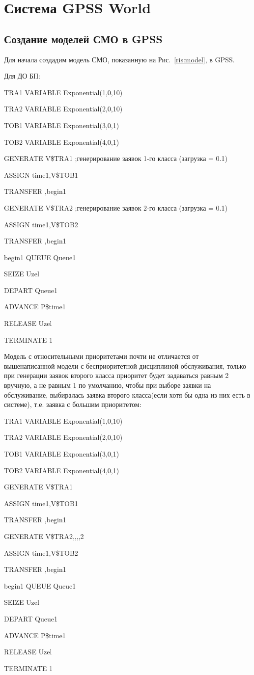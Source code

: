 \documentclass[a4paper,14pt]{report} %
\begin{document}
\section{Система GPSS World}
\subsection{Создание моделей СМО в GPSS}
Для начала создадим модель СМО, показанную на Рис.~\ref{ris:model}, в GPSS.

Для ДО БП:\par\noindent
TRA1	VARIABLE	Exponential(1,0,10) \par\noindent
TRA2	VARIABLE	Exponential(2,0,10) \par\noindent
TOB1	VARIABLE	Exponential(3,0,1) \par\noindent
TOB2	VARIABLE	Exponential(4,0,1)  \par              
GENERATE	V\$TRA1 ;генерирование заявок 1-го класса (загрузка = 0.1)\par 
ASSIGN 	time1,V\$TOB1 \par
TRANSFER ,begin1 \par
GENERATE	V\$TRA2 ;генерирование заявок 2-го класса (загрузка = 0.1)\par 
ASSIGN 	time1,V\$TOB2 \par
TRANSFER ,begin1 \par\noindent
begin1	QUEUE	Queue1 \par
SEIZE 	Uzel \par
DEPART	Queue1 \par
ADVANCE 	P\$time1 \par
RELEASE 	Uzel \par
TERMINATE 1 \par
\vspace{0.5cm} 
Модель с относительными приоритетами почти не отличается от вышенаписанной модели с бесприоритетной дисциплиной обслуживания, только при генерации заявок второго класса приоритет будет задаваться равным 2 вручную, а не равным 1 по умолчанию, чтобы при выборе заявки на обслуживание, выбиралась заявка второго класса(если хотя бы одна из них есть в системе), т.е. заявка с большим приоритетом:\par\noindent
TRA1	VARIABLE	Exponential(1,0,10) \par\noindent
TRA2	VARIABLE	Exponential(2,0,10) \par\noindent
TOB1	VARIABLE	Exponential(3,0,1) \par\noindent
TOB2	VARIABLE	Exponential(4,0,1)  \par              
GENERATE	V\$TRA1 \par 
ASSIGN 	time1,V\$TOB1 \par
TRANSFER ,begin1 \par
GENERATE	V\$TRA2,,,,2 \par 
ASSIGN 	time1,V\$TOB2 \par
TRANSFER ,begin1 \par\noindent
begin1	QUEUE	Queue1 \par
SEIZE 	Uzel \par
DEPART	Queue1 \par
ADVANCE 	P\$time1 \par
RELEASE 	Uzel \par
TERMINATE 1 \par
\end{document}
